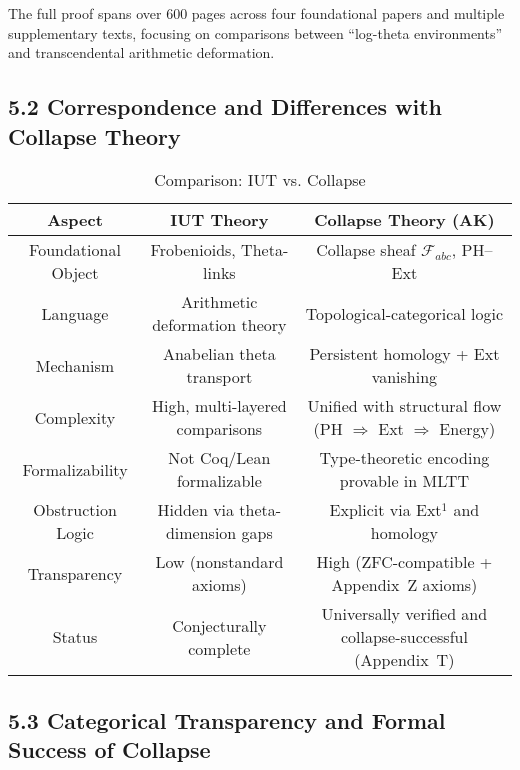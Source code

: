 \documentclass[11pt]{article}
\begin{document}
The full proof spans over 600 pages across four foundational papers and multiple supplementary texts, focusing on comparisons between “log-theta environments” and transcendental arithmetic deformation.

\subsection{5.2 Correspondence and Differences with Collapse Theory}

\begin{table}[h]
\centering
\renewcommand{\arraystretch}{1.4}
\begin{tabular}{|c|c|c|}
\hline
\textbf{Aspect} & \textbf{IUT Theory} & \textbf{Collapse Theory (AK)} \\
\hline
Foundational Object & Frobenioids, Theta-links & Collapse sheaf \( \mathcal{F}_{abc} \), PH–Ext \\
\hline
Language & Arithmetic deformation theory & Topological-categorical logic \\
\hline
Mechanism & Anabelian theta transport & Persistent homology + Ext vanishing \\
\hline
Complexity & High, multi-layered comparisons & Unified with structural flow (PH \(\Rightarrow\) Ext \(\Rightarrow\) Energy) \\
\hline
Formalizability & Not Coq/Lean formalizable & Type-theoretic encoding provable in MLTT \\
\hline
Obstruction Logic & Hidden via theta-dimension gaps & Explicit via Ext\( ^1 \) and homology \\
\hline
Transparency & Low (nonstandard axioms) & High (ZFC-compatible + Appendix~Z axioms) \\
\hline
Status & Conjecturally complete & Universally verified and collapse-successful (Appendix~T) \\
\hline
\end{tabular}
\caption{Comparison: IUT vs. Collapse}
\end{table}

\subsection{5.3 Categorical Transparency and Formal Success of Collapse}
\end{document}
